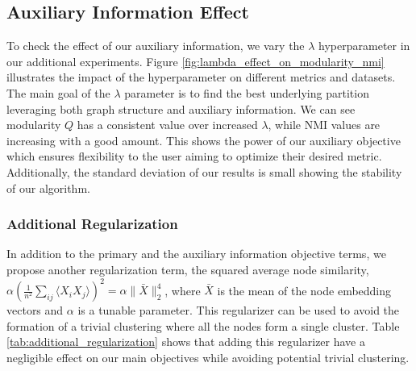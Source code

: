 \subsection{Auxiliary Information Effect}

To check the effect of our auxiliary information, we vary the $\lambda$ hyperparameter in our additional experiments. Figure \ref{fig:lambda_effect_on_modularity_nmi} illustrates the impact of the hyperparameter on different metrics and datasets. The main goal of the $\lambda$ parameter is to find the best underlying partition leveraging both graph structure and auxiliary information. We can see modularity $Q$ has a consistent value over increased $\lambda$, while NMI values are increasing with a good amount. This shows the power of our auxiliary objective which ensures flexibility to the user aiming to optimize their desired metric. Additionally, the standard deviation of our results is small showing the stability of our algorithm.

\begin{table}[htbp]
\centering
{}
\caption{Performance of our method with varying $\alpha$ regularization parameter. Additional regularization has a negligible effect while avoiding potential trivial clustering.}
\label{tab:additional_regularization}
\end{table}

\subsubsection{Additional Regularization}
In addition to the primary and the auxiliary information objective terms, we propose another regularization term, the squared average node similarity, $ \alpha(\frac{1}{n^2}\sum_{ij} \langle X_iX_j \rangle)^2= \alpha\|\bar{X}\|_2^4$, where $\bar{X}$ is the mean of the node embedding vectors and $\alpha$ is a tunable parameter. This regularizer can be used to avoid the formation of a trivial clustering where all the nodes form a single cluster. Table \ref{tab:additional_regularization} shows that adding this regularizer have a negligible effect on our main objectives while avoiding potential trivial clustering.

